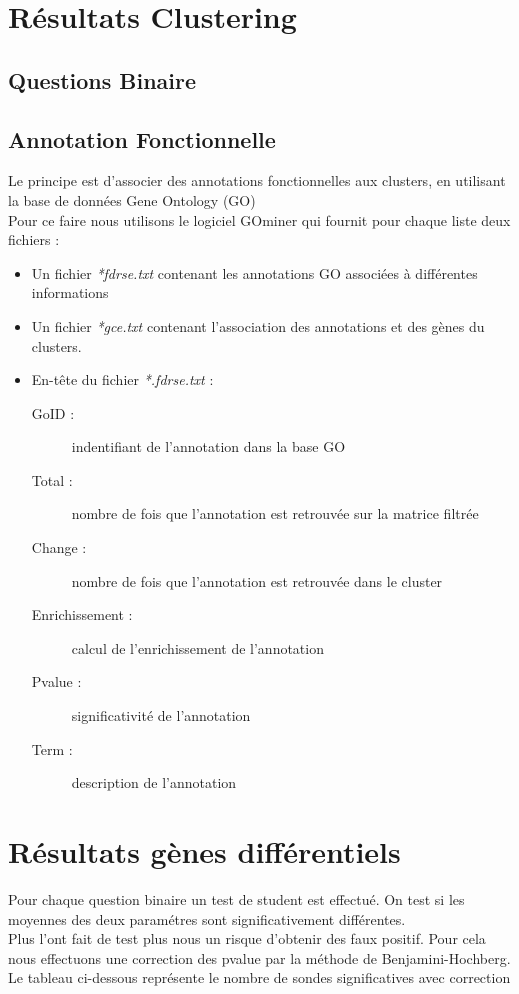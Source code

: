 \documentclass[a4paper]{article}
\begin{document}
\section*{Résultats Clustering}
\subsection*{Questions Binaire}

%

\subsection*{Annotation Fonctionnelle}
Le principe est d'associer des annotations fonctionnelles aux clusters, en utilisant la base de données Gene Ontology (GO)\\
Pour ce faire nous utilisons le logiciel GOminer qui fournit pour chaque liste deux fichiers : 

\par


\begin{itemize}
	\item Un fichier \emph{*fdrse.txt} contenant les annotations GO associées à différentes informations
	\item Un fichier \emph{*gce.txt} contenant l'association des annotations et des gènes du clusters.
\end{itemize}
\begin{itemize}
\item En-tête du fichier \emph{*.fdrse.txt} :
\begin{description}
	\item[GoID : ] indentifiant de l'annotation dans la base GO 
	\item[Total : ] nombre de fois que l'annotation est retrouvée sur la matrice filtrée
	\item[Change : ] nombre de fois que l'annotation est retrouvée dans le cluster
	\item[Enrichissement : ] calcul de l'enrichissement de l'annotation
	\item[Pvalue : ] significativité de l'annotation
	\item[Term : ] description de l'annotation
\end{description}

\end{itemize}
\section*{Résultats gènes différentiels}
Pour chaque question binaire un test de student est effectué. On test si les moyennes des deux paramétres sont significativement différentes.
\\
Plus l'ont fait de test plus nous un risque d'obtenir des faux positif. Pour cela nous effectuons une correction des pvalue par la méthode de Benjamini-Hochberg.
\\
Le tableau ci-dessous représente le nombre de sondes significatives avec correction
\end{document}
